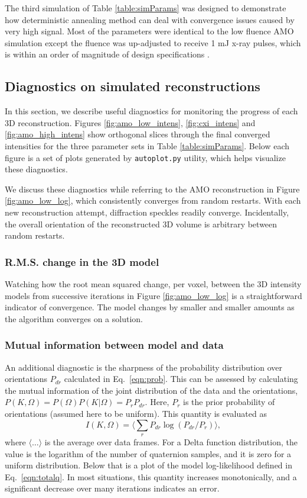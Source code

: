 \documentclass[]{iucr}              %
\begin{document}
The third simulation of Table \ref{table:simParams} was designed to demonstrate how deterministic annealing method can deal with convergence issues caused by very high signal. Most of the parameters were identical to the low fluence AMO simulation except the fluence was up-adjusted to receive 1 mJ x-ray pulses, which is within an order of magnitude of design specifications \cite{Emma2010}.

\subsection{Diagnostics on simulated reconstructions} \label{subsec:recon}
In this section, we describe useful diagnostics for monitoring the progress of each 3D reconstruction. Figures \ref{fig:amo_low_intens}, \ref{fig:cxi_intens} and \ref{fig:amo_high_intens} show orthogonal slices through the final converged intensities for the three parameter sets in Table \ref{table:simParams}. Below each figure is a set of plots generated by \texttt{autoplot.py} utility, which helps visualize these diagnostics. 

We discuss these diagnostics while referring to the AMO reconstruction in Figure \ref{fig:amo_low_log}, which consistently converges from random restarts. With each new reconstruction attempt, diffraction speckles readily converge. Incidentally, the overall orientation of the reconstructed 3D volume is arbitrary between random restarts. 

\subsubsection{R.M.S. change in the 3D model}
Watching how the root mean squared change, per voxel, between the 3D intensity models from successive iterations in Figure \ref{fig:amo_low_log} is a straightforward indicator of convergence. The model changes by smaller and smaller amounts as the algorithm converges on a solution.

\subsubsection{Mutual information between model and data}
An additional diagnostic is the sharpness of the probability distribution over orientations $P_{dr}$ calculated in Eq.~\ref{eqn:prob}. This can be assessed by calculating the mutual information of the joint distribution of the data and the orientations, $P(K,\Omega) = P(\Omega) P(K{\big\vert}\Omega) = P_r P_{dr}$. Here, $P_r$ is the prior probability of orientations (assumed here to be uniform). This quantity is evaluated as
\begin{equation}
I(K, \Omega) = \langle\sum_r P_{dr} \log(P_{dr} / P_{r})\rangle,
\end{equation}
where $\langle \dots \rangle$ is the average over data frames. For a Delta function distribution, the value is the logarithm of the number of quaternion samples, and it is zero for a uniform distribution. Below that is a plot of the model log-likelihood defined in Eq.~\ref{eqn:totalq}. In most situations, this quantity increases monotonically, and a significant decrease over many iterations indicates an error. 
\end{document}
